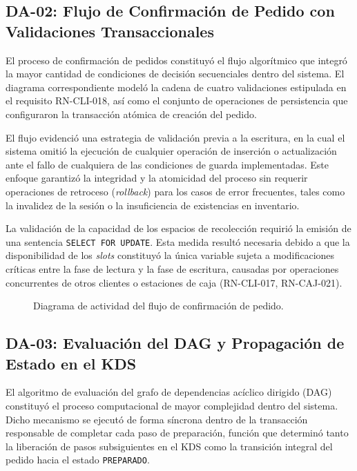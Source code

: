 \subsection{DA-02: Flujo de Confirmación de Pedido con Validaciones Transaccionales}

El proceso de confirmación de pedidos constituyó el flujo algorítmico que integró la mayor cantidad de condiciones de decisión secuenciales dentro del sistema. El diagrama correspondiente modeló la cadena de cuatro validaciones estipulada en el requisito RN-CLI-018, así como el conjunto de operaciones de persistencia que configuraron la transacción atómica de creación del pedido.

El flujo evidenció una estrategia de validación previa a la escritura, en la cual el sistema omitió la ejecución de cualquier operación de inserción o actualización ante el fallo de cualquiera de las condiciones de guarda implementadas. Este enfoque garantizó la integridad y la atomicidad del proceso sin requerir operaciones de retroceso (\textit{rollback}) para los casos de error frecuentes, tales como la invalidez de la sesión o la insuficiencia de existencias en inventario.

La validación de la capacidad de los espacios de recolección requirió la emisión de una sentencia \texttt{SELECT FOR UPDATE}. Esta medida resultó necesaria debido a que la disponibilidad de los \textit{slots} constituyó la única variable sujeta a modificaciones críticas entre la fase de lectura y la fase de escritura, causadas por operaciones concurrentes de otros clientes o estaciones de caja (RN-CLI-017, RN-CAJ-021).

\begin{figure}[H]
    \centering
    
    \caption{Diagrama de actividad del flujo de confirmación de pedido.}
    \label{fig:diagrama-actividad-confirmacion-pedido}
\end{figure}

\subsection{DA-03: Evaluación del DAG y Propagación de Estado en el KDS}

El algoritmo de evaluación del grafo de dependencias acíclico dirigido (DAG) constituyó el proceso computacional de mayor complejidad dentro del sistema. Dicho mecanismo se ejecutó de forma síncrona dentro de la transacción responsable de completar cada paso de preparación, función que determinó tanto la liberación de pasos subsiguientes en el KDS como la transición integral del pedido hacia el estado \texttt{PREPARADO}.

